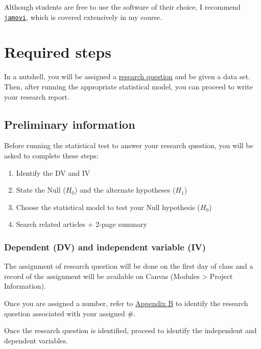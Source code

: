 \documentclass[
]{article}
\providecommand{\tightlist}{%
  \setlength{\itemsep}{0pt}\setlength{\parskip}{0pt}}
\begin{document}
Although students are free to use the software of their choice, I recommend \href{www.jamovi.org}{\texttt{jamovi}}, which is covered extensively in my course.

\hypertarget{steps}{%
\section{Required steps}\label{steps}}

In a nutshell, you will be assigned a \protect\hyperlink{appendix-a}{research question} and be given a data set. Then, after running the appropriate statistical model, you can proceed to write your research report.

\hypertarget{prelim-info}{%
\subsection{Preliminary information}\label{prelim-info}}

Before running the statistical test to answer your research question, you will be asked to complete these steps:

\begin{enumerate}
\def\labelenumi{\arabic{enumi}.}
\tightlist
\item
  Identify the DV and IV
\item
  State the Null (\(H_0\)) and the alternate hypotheses (\(H_1\))
\item
  Choose the statistical model to test your Null hypothesis (\(H_0\))
\item
  Search related articles + 2-page summary
\end{enumerate}

\hypertarget{dependent-dv-and-independent-variable-iv}{%
\subsubsection{Dependent (DV) and independent variable (IV)}\label{dependent-dv-and-independent-variable-iv}}

The assignment of research question will be done on the first day of class and a record of the assignment will be available on Canvas (Modules \textgreater{} Project Information).

Once you are assigned a number, refer to \protect\hyperlink{appendix-b}{Appendix B} to identify the research question associated with your assigned \#.

Once the research question is identified, proceed to identify the independent and dependent variables.
\end{document}
